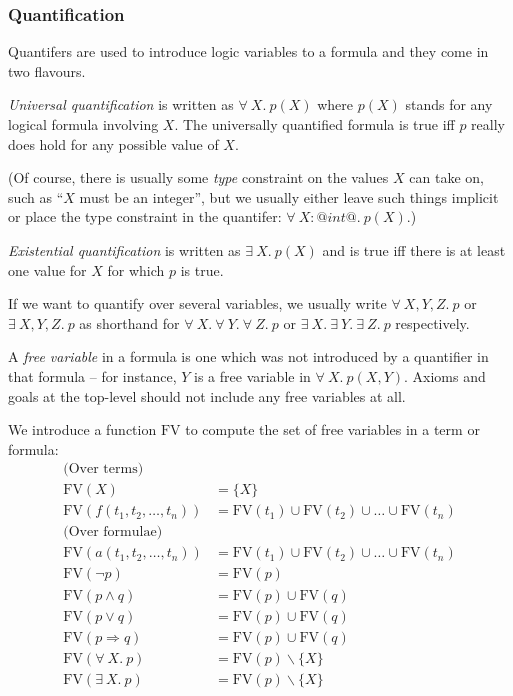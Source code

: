 \documentclass[a4paper,11pt,notitlepage,onecolumn]{article}
\newcommand{\Not}[1]%
{\neg{}#1}
\newcommand{\Conj}%
{\wedge}
\newcommand{\Disj}%
{\vee}
\newcommand{\Imp}%
{\Rightarrow}
\newcommand{\All}[2]%
{\forall\ #1.\ #2}
\newcommand{\Some}[2]%
{\exists\ #1.\ #2}
\newcommand{\Union}%
{\cup}
\newcommand{\Excluding}%
{\backslash}
\newcommand{\FV}%
{\text{FV}}
\begin{document}
\subsubsection{Quantification}

Quantifers are used to introduce logic variables to a formula and they
come in two flavours.

\emph{Universal quantification} is written as $\All{X}{p(X)}$ where
$p(X)$ stands for any logical formula involving $X$.  The universally
quantified formula is true iff $p$ really does hold for any possible
value of $X$.

(Of course, there is usually some \emph{type} constraint on the values
$X$ can take on, such as ``$X$ must be an integer'', but we usually
either leave such things implicit or place the type constraint in the
quantifer: $\All{X:@int@}{p(X)}$.)

\emph{Existential quantification} is written as $\Some{X}{p(X)}$ and is
true iff there is at least one value for $X$ for which $p$ is true.

If we want to quantify over several variables, we usually write
$\All{X, Y, Z}{p}$ or $\Some{X, Y, Z}{p}$ as shorthand
for
$\All{X}{\All{Y}{\All{Z}{p}}}$ or
$\Some{X}{\Some{Y}{\Some{Z}{p}}}$ respectively.

A \emph{free variable} in a formula is one which was not introduced by a
quantifier in that formula -- for instance, $Y$ is a free variable in
$\All{X}{p(X, Y)}$.  Axioms and goals at the top-level should not
include any free variables at all.

We introduce a function $\FV$ to compute the set of free variables in a
term or formula:
\begin{align*}
\text{(Over terms)} \\
\FV(X)
& = \{X\} \\
\FV(f(t_1, t_2, \ldots, t_n))
& = \FV(t_1) \Union \FV(t_2) \Union \ldots \Union \FV(t_n) \\
\text{(Over formulae)} \\
\FV(a(t_1, t_2, \ldots, t_n))
& = \FV(t_1) \Union \FV(t_2) \Union \ldots \Union \FV(t_n) \\
\FV(\Not{p})
& = \FV(p) \\
\FV(p \Conj q)
& = \FV(p) \Union \FV(q) \\
\FV(p \Disj q)
& = \FV(p) \Union \FV(q) \\
\FV(p \Imp q)
& = \FV(p) \Union \FV(q) \\
\FV(\All{X}{p})
& = \FV(p) \Excluding \{X\} \\
\FV(\Some{X}{p})
& = \FV(p) \Excluding \{X\} \\
\end{align*}
\end{document}
